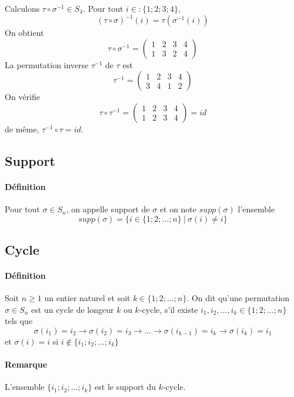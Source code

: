 Calculons $\tau \circ \sigma^{-1} \in S_4$. Pour tout $i \in :\{1; 2; 3; 4\}$,
$$(\tau \circ \sigma)^{-1}(i) = \tau(\sigma^{-1}(i))$$
On obtient
$$\tau \circ \sigma^{-1} = \begin{pmatrix} 1 & 2 & 3 & 4 \\ 1 & 3 & 2 & 4 \end{pmatrix}$$
La permutation inverse $\tau^{-1}$ de $\tau$ est
$$\tau^{-1} = \begin{pmatrix} 1 & 2 & 3 & 4 \\ 3 & 4 & 1 & 2 \end{pmatrix}$$
On vérifie
$$\tau \circ \tau^{-1} = \begin{pmatrix} 1 & 2 & 3 & 4 \\ 1 & 2 & 3 & 4 \end{pmatrix} = id$$
de même, $\tau^{-1} \circ \tau=id$.

%
\subsection{Support}
%
\paragraph{Définition} Pour tout $\sigma \in S_n$, on appelle support de $\sigma$ et on note $supp(\sigma)$ l'ensemble
$$supp(\sigma) = \{i \in \{1; 2; \ldots; n\} ~ \vert ~ \sigma(i) \neq i\}$$

%
\subsection{Cycle}
%
\paragraph{Définition} Soit $n \geq 1$ un entier naturel et soit $k \in \{1; 2; \ldots; n\}$. On dit qu'une permutation $\sigma \in S_n$ est un cycle de longeur $k$ ou $k$-cycle, s'il existe $i_1, i_2, \ldots, i_k \in  \{1; 2; \ldots; n\}$ tels que
$$\sigma(i_1) = i_2 \rightarrow \sigma(i_2) = i_3 \rightarrow \ldots \rightarrow \sigma(i_{k-1}) = i_k \rightarrow \sigma(i_k) = i_1$$
et $\sigma(i) = i$ si $i \notin \{i_1; i_2; \ldots; i_k\}$

\paragraph{Remarque} L'ensemble $\{i_1; i_2; \ldots; i_k\}$ est le support du $k$-cycle.


